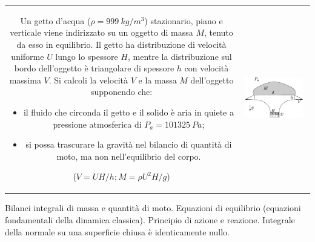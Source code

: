 
\noindent
\begin{tabular}{cc}
\begin{minipage}{0.60\textwidth}
\begin{exerciseS}
Un getto d'acqua ($\rho=999\ kg/m^3 $) stazionario, piano e verticale 
viene indirizzato su un oggetto di massa $M$, tenuto da esso in equilibrio.
 Il getto ha distribuzione di velocità uniforme $U$ lungo lo spessore $H$, 
 mentre la distribuzione sul bordo dell'oggetto è 
triangolare di spessore $h$ con velocità massima $V$. Si calcoli la velocità $V$
e la massa $M$ dell'oggetto supponendo che:
\begin{itemize}
  \item il fluido che circonda il getto e il solido \`e aria in quiete a
  pressione atmosferica di $P_a = 101325\  Pa$;
  \item si possa trascurare la gravità nel bilancio di quantità di moto, ma non
nell'equilibrio del corpo.
\end{itemize} 


($V = U H / h ; M = \rho U^2 H / g$)
\end{exerciseS}
\end{minipage}
&
\begin{minipage}{0.35\textwidth}
   \begin{center}
   \includegraphics[width=0.90\textwidth]{./fig/gettoPiattello.eps}
   \end{center}
\end{minipage}
\end{tabular}

\vspace{1.0cm}

\sol

\partone
  Bilanci integrali di massa e quantità di moto. Equazioni di equilibrio (equazioni fondamentali della dinamica classica). Principio di azione e reazione. Integrale della normale su una superficie chiusa è identicamente nullo.

